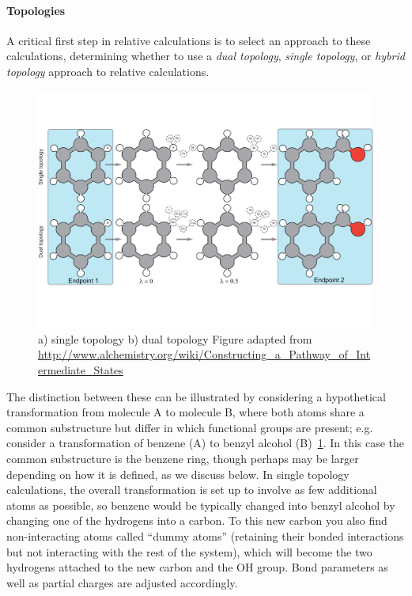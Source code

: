 \documentclass[9pt,bestpractices]{livecoms}
\begin{document}
\paragraph{Topologies} A critical first step in relative calculations is to select an approach to these calculations, determining whether to use a \emph{dual topology}, \emph{single topology}, or \emph{hybrid topology} approach to relative calculations.
\begin{figure}
    \includegraphics[width=0.95\linewidth]{paper/figures/fig4/topologies.pdf}
    \caption{a) single topology b) dual topology Figure adapted from \url{http://www.alchemistry.org/wiki/Constructing_a_Pathway_of_Intermediate_States}}
    \label{fig:topology}
\end{figure} 
The distinction between these can be illustrated by considering a hypothetical transformation from molecule A to molecule B, where both atoms share a common substructure but differ in which functional groups are present; e.g. consider a transformation of benzene (A) to benzyl alcohol (B)~\ref{fig:topology}.
In this case the common substructure is the benzene ring, though perhaps may be larger depending on how it is defined, as we discuss below.
In single topology calculations, the overall transformation is set up to involve as few additional atoms as possible, so benzene would be typically changed into benzyl alcohol by changing one of the hydrogens into a carbon. To this new carbon you also find non-interacting atoms called ``dummy atoms'' (retaining their bonded interactions but not interacting with the rest of the system), which will become the two hydrogens attached to the new carbon and the OH group. Bond parameters as well as partial charges are adjusted accordingly. 
\end{document}
